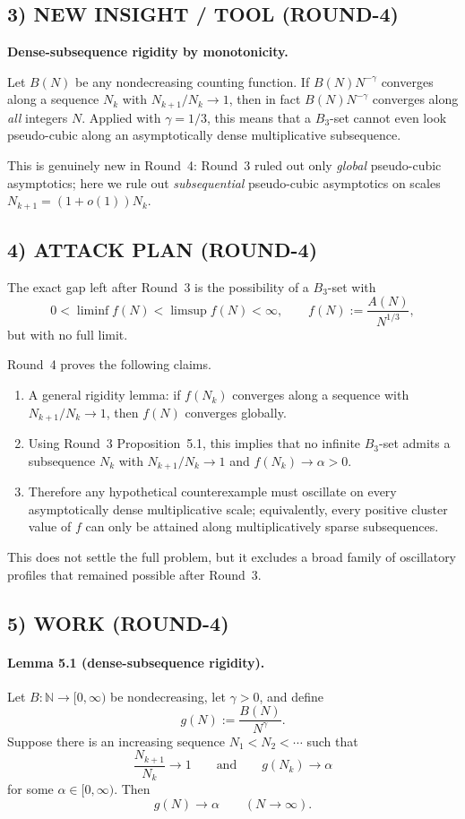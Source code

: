\subsection{3) NEW INSIGHT / TOOL (ROUND-4)}
\textbf{Dense-subsequence rigidity by monotonicity.}

Let $B(N)$ be any nondecreasing counting function. If $B(N)N^{-\gamma}$ converges along a sequence $N_k$ with $N_{k+1}/N_k\to 1$, then in fact $B(N)N^{-\gamma}$ converges along \emph{all} integers $N$. Applied with $\gamma=1/3$, this means that a $B_3$-set cannot even look pseudo-cubic along an asymptotically dense multiplicative subsequence.

This is genuinely new in Round~4: Round~3 ruled out only \emph{global} pseudo-cubic asymptotics; here we rule out \emph{subsequential} pseudo-cubic asymptotics on scales $N_{k+1}=(1+o(1))N_k$.

\subsection{4) ATTACK PLAN (ROUND-4)}
The exact gap left after Round~3 is the possibility of a $B_3$-set with
\[
0<\liminf f(N)<\limsup f(N)<\infty,
\qquad f(N):=\frac{A(N)}{N^{1/3}},
\]
but with no full limit.

Round~4 proves the following claims.
\begin{enumerate}
  \item A general rigidity lemma: if $f(N_k)$ converges along a sequence with $N_{k+1}/N_k\to 1$, then $f(N)$ converges globally.
  \item Using Round~3 Proposition~5.1, this implies that no infinite $B_3$-set admits a subsequence $N_k$ with $N_{k+1}/N_k\to 1$ and $f(N_k)\to \alpha>0$.
  \item Therefore any hypothetical counterexample must oscillate on every asymptotically dense multiplicative scale; equivalently, every positive cluster value of $f$ can only be attained along multiplicatively sparse subsequences.
\end{enumerate}
This does not settle the full problem, but it excludes a broad family of oscillatory profiles that remained possible after Round~3.

\subsection{5) WORK (ROUND-4)}

\paragraph{Lemma 5.1 (dense-subsequence rigidity).}
Let $B:\mathbb{N}\to[0,\infty)$ be nondecreasing, let $\gamma>0$, and define
\[
g(N):=\frac{B(N)}{N^{\gamma}}.
\]
Suppose there is an increasing sequence $N_1<N_2<\cdots$ such that
\[
\frac{N_{k+1}}{N_k}\to 1
\qquad\text{and}\qquad
g(N_k)\to \alpha
\]
for some $\alpha\in[0,\infty)$. Then
\[
g(N)\to \alpha\qquad (N\to\infty).
\]

